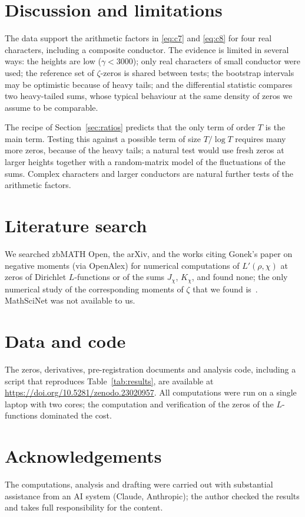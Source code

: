 \documentclass[11pt]{amsart}
\newcommand{\Lp}{L'}
\begin{document}
\section{Discussion and limitations}

The data support the arithmetic factors in \eqref{eq:c7} and \eqref{eq:c8} for four real characters, including a
composite conductor. The evidence is limited in several ways: the heights are low ($\gamma<3000$); only real characters
of small conductor were used; the reference set of $\zeta$-zeros is shared between tests; the bootstrap intervals may
be optimistic because of heavy tails; and the differential statistic compares two heavy-tailed sums, whose typical
behaviour at the same density of zeros we assume to be comparable.

The recipe of Section~\ref{sec:ratios} predicts that the only term of order $T$ is the main term. Testing this against
a possible term of size $T/\log T$ requires many more zeros, because of the heavy tails; a natural test would use fresh
zeros at larger heights together with a random-matrix model of the fluctuations of the sums. Complex characters and
larger conductors are natural further tests of the arithmetic factors.

\section{Literature search}\label{sec:search}
We searched zbMATH Open, the arXiv, and the works citing Gonek's paper on negative moments (via OpenAlex) for numerical
computations of $\Lp(\rho,\chi)$ at zeros of Dirichlet $L$-functions or of the sums $J_\chi$, $K_\chi$, and found none;
the only numerical study of the corresponding moments of $\zeta$ that we found is~\cite{HO}. MathSciNet was not
available to us. %

\section*{Data and code}
The zeros, derivatives, pre-registration documents and analysis code, including a script that reproduces
Table~\ref{tab:results}, are available at \url{https://doi.org/10.5281/zenodo.23020957}.
All computations were run on a single laptop with two cores; the computation and verification of the zeros of the
$L$-functions dominated the cost.

\section*{Acknowledgements}
The computations, analysis and drafting were carried out with substantial assistance from an AI system (Claude,
Anthropic); the author checked the results and takes full responsibility for the content.
\end{document}
